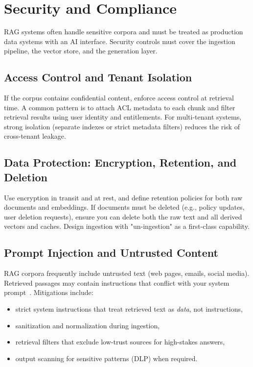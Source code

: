 \FloatBarrier
\section{Security and Compliance}
\label{sec:rag-security-and-compliance}
RAG systems often handle sensitive corpora and must be treated as production data systems with an AI interface. Security controls must cover the ingestion pipeline, the vector store, and the generation layer.

\subsection{Access Control and Tenant Isolation}
If the corpus contains confidential content, enforce access control at retrieval time. A common pattern is to attach ACL metadata to each chunk and filter retrieval results using user identity and entitlements. For multi-tenant systems, strong isolation (separate indexes or strict metadata filters) reduces the risk of cross-tenant leakage.

\subsection{Data Protection: Encryption, Retention, and Deletion}
Use encryption in transit and at rest, and define retention policies for both raw documents and embeddings. If documents must be deleted (e.g., policy updates, user deletion requests), ensure you can delete both the raw text and all derived vectors and caches. Design ingestion with "un-ingestion" as a first-class capability.

\subsection{Prompt Injection and Untrusted Content}
RAG corpora frequently include untrusted text (web pages, emails, social media). Retrieved passages may contain instructions that conflict with your system prompt~\cite{OWASP2024LLMTop10}. Mitigations include:
\begin{itemize}
    \item strict system instructions that treat retrieved text as \emph{data}, not instructions,
    \item sanitization and normalization during ingestion,
    \item retrieval filters that exclude low-trust sources for high-stakes answers,
    \item output scanning for sensitive patterns (DLP) when required.
\end{itemize}

